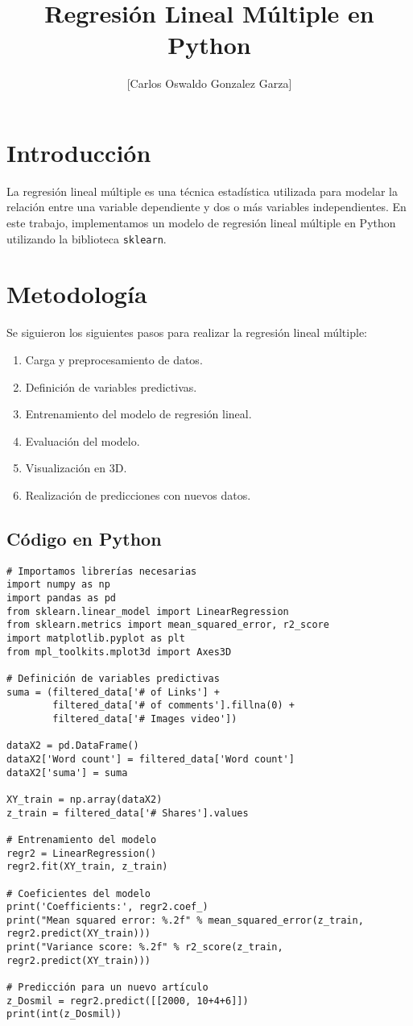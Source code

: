 \documentclass{article}
\title{Regresi\'on Lineal M\'ultiple en Python}
\author{[Carlos Oswaldo Gonzalez Garza]}
\begin{document}
\maketitle

\section{Introducci\'on}
La regresi\'on lineal m\'ultiple es una t\'ecnica estad\'istica utilizada para modelar la relaci\'on entre una variable dependiente y dos o m\'as variables independientes. En este trabajo, implementamos un modelo de regresi\'on lineal m\'ultiple en Python utilizando la biblioteca \texttt{sklearn}.

\section{Metodolog\'ia}
Se siguieron los siguientes pasos para realizar la regresi\'on lineal m\'ultiple:
\begin{enumerate}
    \item Carga y preprocesamiento de datos.
    \item Definici\'on de variables predictivas.
    \item Entrenamiento del modelo de regresi\'on lineal.
    \item Evaluaci\'on del modelo.
    \item Visualizaci\'on en 3D.
    \item Realizaci\'on de predicciones con nuevos datos.
\end{enumerate}

\subsection{C\'odigo en Python}
\begin{verbatim}
# Importamos librerías necesarias
import numpy as np
import pandas as pd
from sklearn.linear_model import LinearRegression
from sklearn.metrics import mean_squared_error, r2_score
import matplotlib.pyplot as plt
from mpl_toolkits.mplot3d import Axes3D

# Definición de variables predictivas
suma = (filtered_data['# of Links'] + 
        filtered_data['# of comments'].fillna(0) + 
        filtered_data['# Images video'])

dataX2 = pd.DataFrame()
dataX2['Word count'] = filtered_data['Word count']
dataX2['suma'] = suma

XY_train = np.array(dataX2)
z_train = filtered_data['# Shares'].values

# Entrenamiento del modelo
regr2 = LinearRegression()
regr2.fit(XY_train, z_train)

# Coeficientes del modelo
print('Coefficients:', regr2.coef_)
print("Mean squared error: %.2f" % mean_squared_error(z_train, regr2.predict(XY_train)))
print("Variance score: %.2f" % r2_score(z_train, regr2.predict(XY_train)))

# Predicción para un nuevo artículo
z_Dosmil = regr2.predict([[2000, 10+4+6]])
print(int(z_Dosmil))
\end{verbatim}
\end{document}
